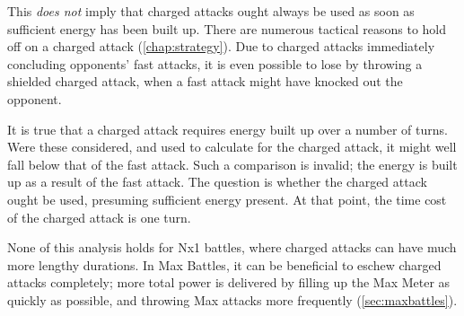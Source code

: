 This \textit{does not} imply that charged attacks ought always be used as soon as
  sufficient energy has been built up.
There are numerous tactical reasons to hold off on a charged attack (\autoref{chap:strategy}).
Due to charged attacks immediately concluding opponents' fast attacks,
 it is even possible to lose by throwing a shielded charged attack, when
 a fast attack might have knocked out the opponent.

It is true that a charged attack requires energy built up over a number of turns.
Were these considered, and used to calculate \PPT{} for the charged attack,
  it might well fall below that of the fast attack.
Such a comparison is invalid; the energy is built up as a result of the fast attack.
The question is whether the charged attack ought be used, presuming sufficient energy present.
At that point, the time cost of the charged attack is one turn.

None of this analysis holds for Nx1 battles, where charged attacks can have much more lengthy durations.
In Max Battles, it can be beneficial to eschew charged attacks completely;
 more total power is delivered by filling up the Max Meter as quickly as possible,
 and throwing Max attacks more frequently (\autoref{sec:maxbattles}).

